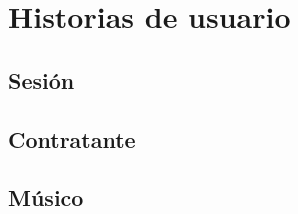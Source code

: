 \section{Historias de usuario}
\subsection{Sesión}

\newpage
\subsection{Contratante}

\newpage
\subsection{Músico}

